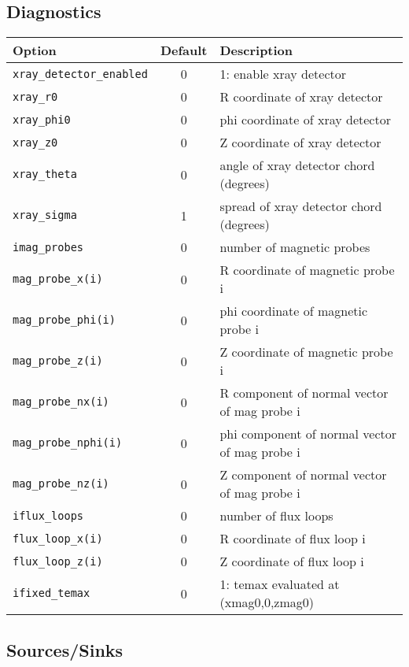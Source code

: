 \subsection{Diagnostics}

\begin{tabular}{lcp{4in}}
  \textbf{Option}&\textbf{Default}&\textbf{Description}\\
  \hline
 \texttt{xray\_detector\_enabled} & 0 &  1:  enable xray detector \\
 \texttt{xray\_r0}     & 0 &  R coordinate of xray detector \\
 \texttt{xray\_phi0}   & 0 &  phi coordinate of xray detector \\
 \texttt{xray\_z0}     & 0 &  Z coordinate of xray detector \\
 \texttt{xray\_theta}  & 0 & angle of xray detector chord (degrees) \\
 \texttt{xray\_sigma} & 1 &  spread of xray detector chord (degrees) \\
 \texttt{imag\_probes}& 0 &  number of magnetic probes \\
 \texttt{mag\_probe\_x(i)} & 0 &    R coordinate of magnetic probe i \\
 \texttt{mag\_probe\_phi(i)} & 0 & phi coordinate of magnetic probe i \\
 \texttt{mag\_probe\_z(i)}   & 0 & Z coordinate of magnetic probe i \\
 \texttt{mag\_probe\_nx(i)}  & 0 & R component of normal vector of mag probe i \\
 \texttt{mag\_probe\_nphi(i)}& 0 & phi component of normal vector of mag probe i \\
 \texttt{mag\_probe\_nz(i)}  & 0 & Z component of normal vector of mag probe i \\
 \texttt{iflux\_loops}       & 0 & number of flux loops \\
 \texttt{flux\_loop\_x(i)}   & 0 & R coordinate of flux loop i \\
 \texttt{flux\_loop\_z(i)}   & 0 & Z coordinate of flux loop i \\
 \texttt{ifixed\_temax}      & 0 & 1: temax evaluated at (xmag0,0,zmag0)

\end{tabular}
\subsection{Sources/Sinks}


